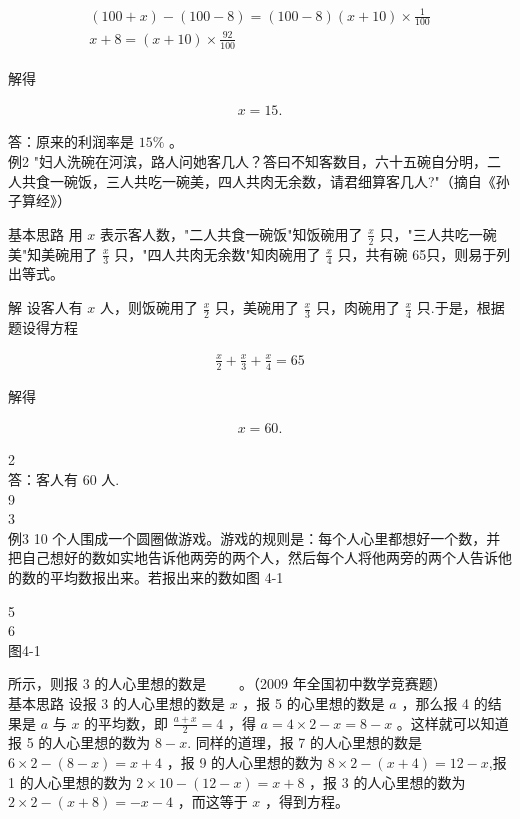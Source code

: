 \documentclass[10pt]{article}
\begin{document}
\begin{align*}
\begin{gathered}
(100+x)-(100-8)=(100-8)(x+10) \times \frac{1}{100} \\
x+8=(x+10) \times \frac{92}{100}
\end{gathered}
\end{align*}

解得

\begin{align*}
x=15 .
\end{align*}

答：原来的利润率是 $15 \%$ 。\\
例2 "妇人洗碗在河滨，路人问她客几人？答曰不知客数目，六十五碗自分明，二人共食一碗饭，三人共吃一碗美，四人共肉无余数，请君细算客几人?"（摘自《孙子算经》）

基本思路 用 $x$ 表示客人数，"二人共食一碗饭"知饭碗用了 $\frac{x}{2}$ 只，"三人共吃一碗美"知美碗用了 $\frac{x}{3}$ 只，"四人共肉无余数"知肉碗用了 $\frac{x}{4}$ 只，共有碗 65只，则易于列出等式。

解 设客人有 $x$ 人，则饭碗用了 $\frac{x}{2}$ 只，美碗用了 $\frac{x}{3}$ 只，肉碗用了 $\frac{x}{4}$ 只.于是，根据题设得方程

\begin{align*}
\frac{x}{2}+\frac{x}{3}+\frac{x}{4}=65
\end{align*}

解得

\begin{align*}
x=60 . \tag{10}
\end{align*}

2\\
答：客人有 60 人.\\
9\\
3\\
例3 10 个人围成一个圆圈做游戏。游戏的规则是：每个人心里都想好一个数，并把自己想好的数如实地告诉他两旁的两个人，然后每个人将他两旁的两个人告诉他的数的平均数报出来。若报出来的数如图 4-1

5\\
6\\
图4-1

所示，则报 3 的人心里想的数是 $\qquad$。（2009 年全国初中数学竞赛题）\\
基本思路 设报 3 的人心里想的数是 $x$ ，报 5 的心里想的数是 $a$ ，那么报 4 的结果是 $a$ 与 $x$ 的平均数，即 $\frac{a+x}{2}=4$ ，得 $a=4 \times 2-x=8-x$ 。这样就可以知道报 5 的人心里想的数为 $8-x$. 同样的道理，报 7 的人心里想的数是 $6 \times 2-(8-x)=x+4$ ，报 9 的人心里想的数为 $8 \times 2-(x+4)=12-x$,报 1 的人心里想的数为 $2 \times 10-(12-x)=x+8$ ，报 3 的人心里想的数为 $2 \times 2-(x+8)=-x-4$ ，而这等于 $x$ ，得到方程。
\end{document}
